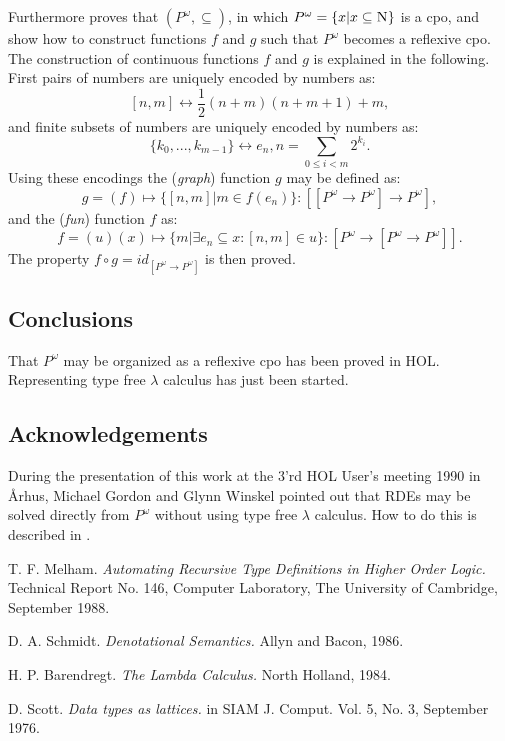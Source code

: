 Furthermore \cite{barendregt:lambda} proves that
\((P^\omega, \subseteq)\), in which
\(P^\omega = \{ x | x \subseteq \mbox{\sc N} \} \)
is a cpo, and show how to construct functions \(f\) and \(g\) such that
\(P^\omega\) becomes a reflexive cpo.  The construction of continuous functions
\(f\) and \(g\) is explained in the following. First pairs of numbers are
uniquely encoded by numbers as:
\[[n,m] \leftrightarrow \frac{1}{2}(n+m)(n+m+1)+m,\]
and finite subsets of numbers are uniquely encoded by numbers as:
\[\{k_0,...,k_{m-1}\} \leftrightarrow e_n, n=\sum_{0\leq i < m} 2^{k_i}.\]
Using these encodings the ({\em graph}) function \(g\) may be defined as:
\[g = (f) \mapsto\{[n,m]|m \in f(e_n)\}
    : [[P^\omega \rightarrow P^\omega] \rightarrow P^\omega],\]
and the ({\em fun}) function \(f\) as:
\[f = (u) (x) \mapsto \{m|\exists e_n\subseteq x: [n,m]\in u\}
    : [P^\omega \rightarrow [P^\omega \rightarrow P^\omega]].\]
The property \(f \circ g = id_{[P^\omega \rightarrow P^\omega]}\) is then
proved.

\subsection*{Conclusions}
That \(P^\omega\) may be organized as a reflexive cpo has been proved
in HOL.
Representing type free \(\lambda\) calculus has just been started.

\subsection*{Acknowledgements}
During the presentation of this work at the 3'rd HOL User's meeting 1990 in
{\AA}rhus, Michael Gordon and Glynn Winskel pointed out that RDEs may
be solved directly from \(P^\omega\) without using type free
\(\lambda\) calculus.  How to do this is described in
\cite{scott:type}.

\begin{thebibliography}{Barendregt}
T. F. Melham.
{\em Automating Recursive Type Definitions in Higher Order Logic.}
Technical Report No. 146, Computer Laboratory,
The University of Cambridge, September 1988.

D. A. Schmidt.
{\em Denotational Semantics.}
Allyn and Bacon, 1986.

H. P. Barendregt.
{\em The Lambda Calculus.}
North Holland, 1984.

D. Scott.
{\em Data types as lattices.}
in {\sc SIAM J. Comput.} Vol. 5, No. 3, September 1976.

\end{thebibliography}

